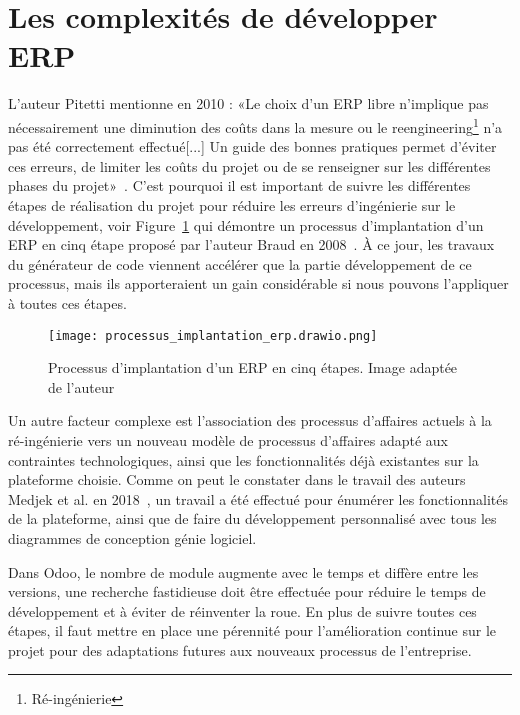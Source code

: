 \section{Les complexités de développer ERP}

L'auteur Pitetti mentionne en 2010 : «Le choix d’un ERP libre n’implique pas nécessairement une diminution des coûts dans la mesure ou le reengineering\footnote{Ré-ingénierie} n’a pas été correctement effectué[...] Un guide des bonnes pratiques permet d’éviter ces erreurs, de limiter les coûts du projet ou de se renseigner sur les différentes phases du projet»~\cite{pitetti2010implementation}. C'est pourquoi il est important de suivre les différentes étapes de réalisation du projet pour réduire les erreurs d'ingénierie sur le développement, voir Figure~\ref{fig:erp_implantation_cinq_etape} qui démontre un processus d'implantation d'un ERP en cinq étape proposé par l'auteur Braud en 2008~\cite{uqam_erp_benefice_2008}. À ce jour, les travaux du générateur de code viennent accélérer que la partie développement de ce processus, mais ils apporteraient un gain considérable si nous pouvons l'appliquer à toutes ces étapes.

\begin{figure}[htb]
\centering
\texttt{[image: processus\_implantation\_erp.drawio.png]}
\caption{Processus d'implantation d'un ERP en cinq étapes. Image adaptée de l'auteur~\cite{uqam_erp_benefice_2008}}
\label{fig:erp_implantation_cinq_etape}
\end{figure}


Un autre facteur complexe est l'association des processus d'affaires actuels à la ré-ingénierie vers un nouveau modèle de processus d'affaires adapté aux contraintes technologiques, ainsi que les fonctionnalités déjà existantes sur la plateforme choisie. Comme on peut le constater dans le travail des auteurs Medjek et al. en 2018~\cite{kenza2018conception}, un travail a été effectué pour énumérer les fonctionnalités de la plateforme, ainsi que de faire du développement personnalisé avec tous les diagrammes de conception génie logiciel.

Dans Odoo, le nombre de module augmente avec le temps et diffère entre les versions, une recherche fastidieuse doit être effectuée pour réduire le temps de développement et à éviter de réinventer la roue. En plus de suivre toutes ces étapes, il faut mettre en place une pérennité pour l’amélioration continue sur le projet pour des adaptations futures aux nouveaux processus de l'entreprise.

